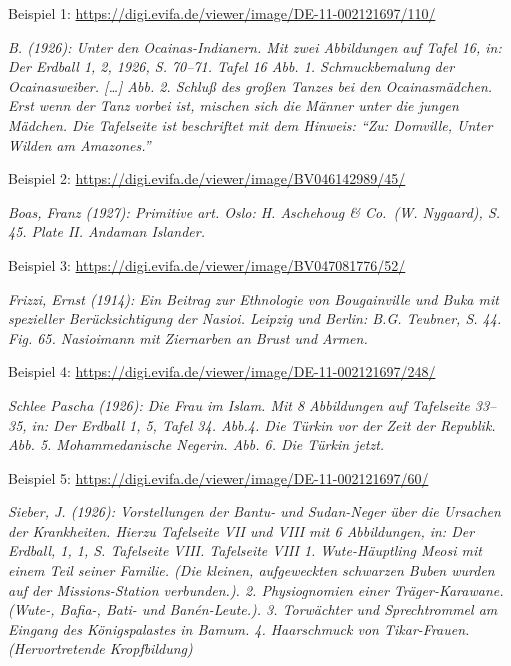 \documentclass[a4paper,
fontsize=11pt,
oneside,
numbers=noperiodatend,
parskip=half-,
bibliography=totoc,
final
]{scrartcl}
\begin{document}
Beispiel 1:
\url{https://digi.evifa.de/viewer/image/DE-11-002121697/110/}

\emph{B. (1926): Unter den Ocainas-Indianern. Mit zwei Abbildungen auf
Tafel 16, in: Der Erdball 1, 2, 1926, S. 70--71. Tafel 16 Abb. 1.
Schmuckbemalung der Ocainasweiber. {[}\ldots{]} Abb. 2. Schluß des
großen Tanzes bei den Ocainasmädchen. Erst wenn der Tanz vorbei ist,
mischen sich die Männer unter die jungen Mädchen. Die Tafelseite ist
beschriftet mit dem Hinweis: \enquote{Zu: Domville, Unter Wilden am
Amazones.}}

Beispiel 2: \url{https://digi.evifa.de/viewer/image/BV046142989/45/}

\emph{Boas, Franz (1927): Primitive art. Oslo: H. Aschehoug \& Co.~(W.
Nygaard), S. 45. Plate II. Andaman Islander.}

Beispiel 3: \url{https://digi.evifa.de/viewer/image/BV047081776/52/}

\emph{Frizzi, Ernst (1914): Ein Beitrag zur Ethnologie von Bougainville
und Buka mit spezieller Berücksichtigung der Nasioi. Leipzig und Berlin:
B.G. Teubner, S. 44. Fig. 65. Nasioimann mit Ziernarben an Brust und
Armen.}

Beispiel 4:
\url{https://digi.evifa.de/viewer/image/DE-11-002121697/248/}

\emph{Schlee Pascha (1926): Die Frau im Islam. Mit 8 Abbildungen auf
Tafelseite 33--35, in: Der Erdball 1, 5, Tafel 34. Abb.4. Die Türkin vor
der Zeit der Republik. Abb. 5. Mohammedanische Negerin. Abb. 6. Die
Türkin jetzt.}

Beispiel 5: \url{https://digi.evifa.de/viewer/image/DE-11-002121697/60/}

\emph{Sieber, J. (1926): Vorstellungen der Bantu- und Sudan-Neger über
die Ursachen der Krankheiten. Hierzu Tafelseite VII und VIII mit 6
Abbildungen, in: Der Erdball, 1, 1, S. Tafelseite VIII. Tafelseite VIII
1. Wute-Häuptling Meosi mit einem Teil seiner Familie. (Die kleinen,
aufgeweckten schwarzen Buben wurden auf der Missions-Station
verbunden.). 2. Physiognomien einer Träger-Karawane. (Wute-, Bafia-,
Bati- und Banén-Leute.). 3. Torwächter und Sprechtrommel am Eingang des
Königspalastes in Bamum. 4. Haarschmuck von Tikar-Frauen.
(Hervortretende Kropfbildung)}
\end{document}
